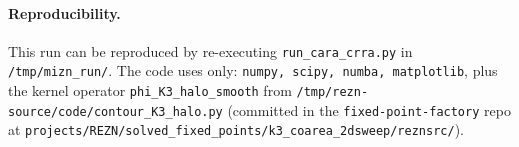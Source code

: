 \documentclass[11pt]{article}
\begin{document}
\paragraph{Reproducibility.} This run can be reproduced by re-executing
\texttt{run\_cara\_crra.py} in \texttt{/tmp/mizn\_run/}. The code uses only:
\texttt{numpy, scipy, numba, matplotlib}, plus the kernel operator
\texttt{phi\_K3\_halo\_smooth} from \texttt{/tmp/rezn-source/code/contour\_K3\_halo.py}
(committed in the \texttt{fixed-point-factory} repo at
\texttt{projects/REZN/solved\_fixed\_points/k3\_coarea\_2dsweep/reznsrc/}).
\end{document}
